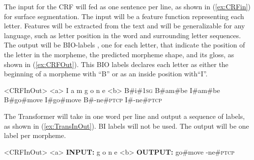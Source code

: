The input for the CRF will fed as one sentence per line, as shown in (\ref{ex:CRFin}) for surface segmentation. The input will be a feature function representing each letter. Features will be extracted from the text and will be generalizable for any language, such as letter position in the word and surrounding letter sequences. The output will be BIO-labels \citep{ramshaw1999}, one for each letter, that indicate the position of the letter in the morpheme, the predicted morpheme shape, and its gloss, as shown in (\ref{ex:CRFOut}). This BIO labels declares each letter as either the beginning of a morpheme with ``B'' or as an inside position with``I''. 

\begin{singlespace}
\pex<CRFInOut>   
\label{ex:CRFInOut}
\a<a> \hspace{7 mm} I \hspace{13 mm} a \hspace{14 mm} m \hspace{15 mm} g \hspace{18 mm} o \hspace{20 mm} n \hspace{19 mm} e 
\label{ex:CRFin}
\a<b> B\#i\#1\textsc{sg} \hspace{.25 mm} B\#am\#be \hspace{.25 mm} I\#am\#be \hspace{.25 mm} B\#go\#move \hspace{.25 mm} I\#go\#move \hspace{.25 mm} B\#-ne\#\textsc{ptcp} \hspace{.25 mm} I\#-ne\#\textsc{ptcp}
\label{ex:CRFOut}
\xe
\end{singlespace}

The Transformer will take in one word per line and output a sequence of labels, as shown in (\ref{ex:TransInOut}). BI labels will not be used. The output will be one label per morpheme. 

\begin{singlespace}
\pex<CRFInOut>   
\label{ex:TransInOut}
\a<a> \textbf{INPUT:} \hspace{6 mm} g \hspace{2 mm} o \hspace{2 mm} n \hspace{2 mm} e 
\label{ex:Transin}
\a<b> \textbf{OUTPUT:} \hspace{3 mm} go\#move \hspace{1 mm} -ne\#\textsc{ptcp} 
\label{ex:TransOut}
\xe
\end{singlespace}

